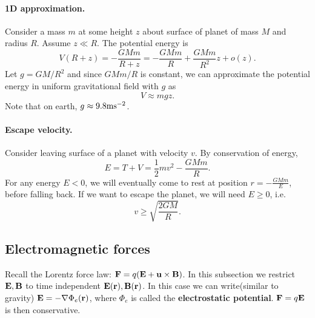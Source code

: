 \paragraph{1D approximation.} Consider a mass $m$ at some height $z$ about surface of planet of mass $M$ and radius $R$. Assume $z\ll R $. The potential energy is 
\[
    V(R+z) = -\frac{GMm}{R+z} = -\frac{GMm}{R}+\frac{GMm}{R^2}z+o(z).
\]
Let $ g = GM/R^2 $ and since $ GMm/R $ is constant, we can approximate the potential energy in uniform gravitational field with $g$ as 
\[
    V\approx mgz.
\]
Note that on earth, $ g\approx 9.8\mathrm{m}\mathrm{s}^{-2} $.

\paragraph{Escape velocity.} Consider leaving surface of a planet with velocity $v$. By conservation of energy,
\[
    E = T+V = \frac{1}{2}mv^2-\frac{GMm}{R}.
\]
For any energy $E < 0$, we will eventually come to rest at position $r = -\frac{GMm}{E}$, before falling back. If we want to escape the planet, we will need $ E\ge 0 $, i.e. 
\[
    v\ge \sqrt{\frac{2GM}{R}}.
\]
\begin{center}
\end{center}

\subsection{Electromagnetic forces}
Recall the Lorentz force law: $ \mathbf{F} = q({\bf E}+{\bf u} \times {\bf B}) $. In this subsection we restrict ${\bf E},{\bf B}$ to time independent $ {\bf E}({\bf r}),{\bf B}({\bf r}) $. In this case we can write(similar to gravity) $ {\bf E} = - \nabla \Phi_e({\bf r}) $, where $ \Phi_e $ is called the \textbf{electrostatic potential}. ${\bf F}=q{\bf E}$ is then conservative.

